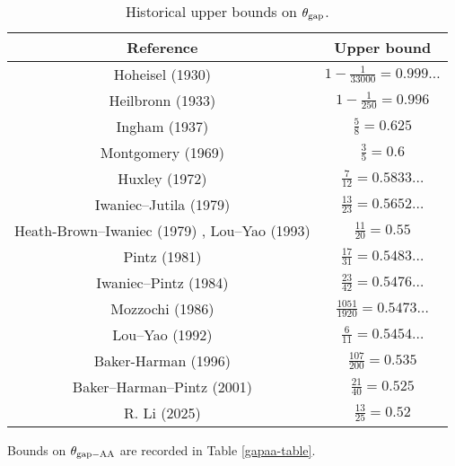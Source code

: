 \begin{table}[ht]
    \caption{Historical upper bounds on $\theta_{\mathrm{gap}}$.}
    \centering
    \renewcommand{\arraystretch}{1.2}
    \begin{tabular}{|c|c|}
    \hline
    Reference & Upper bound \\
    \hline
    Hoheisel (1930) \cite{hoheisel_1930} & $1 - \frac{1}{33000} = 0.999\dots$ \\
    \hline
    Heilbronn (1933) \cite{heilbronn_1933} & $1 - \frac{1}{250} = 0.996$ \\
    \hline
    Ingham (1937) \cite{ingham_difference_1937} & $\frac{5}{8} = 0.625$ \\
    \hline
    Montgomery (1969) \cite{montgomery_1969} & $\frac{3}{5} = 0.6$ \\
    \hline
    Huxley (1972) \cite{Huxley} & $\frac{7}{12} = 0.5833\dots$ \\
    \hline
    Iwaniec--Jutila (1979)\cite{iwaniec-jutila} & $\frac{13}{23} = 0.5652\dots$ \\
    \hline
    Heath-Brown--Iwaniec (1979) \cite{heathbrown_iwaniec_1979}, Lou--Yao (1993) \cite{lou_yao_number_1993}& $\frac{11}{20} = 0.55$ \\
    \hline
    Pintz (1981) \cite{pintz_1981} & $\frac{17}{31} = 0.5483\dots$ \\
    \hline
    Iwaniec--Pintz (1984) \cite{iwaniec-pintz} & $\frac{23}{42} = 0.5476\dots$\\
    \hline
    Mozzochi (1986) \cite{mozzochi-consecutive} & $\frac{1051}{1920} = 0.5473\dots$ \\
    \hline
    Lou--Yao (1992) \cite{lou-yao-chebychev} & $\frac{6}{11} = 0.5454\dots$\\
    \hline
    Baker-Harman (1996) \cite{baker-harman} & $\frac{107}{200} = 0.535$\\
    \hline
    Baker--Harman--Pintz (2001) \cite{baker-harman-pintz} & $\frac{21}{40} = 0.525$ \\
    \hline
    R. Li (2025) \cite{li_number_2025} & $\frac{13}{25} = 0.52$\\
    \hline
    \end{tabular}
    \end{table}\label{gapmax-table}

Bounds on $\theta_{\mathrm{gap-AA}}$ are recorded in Table \ref{gapaa-table}.


